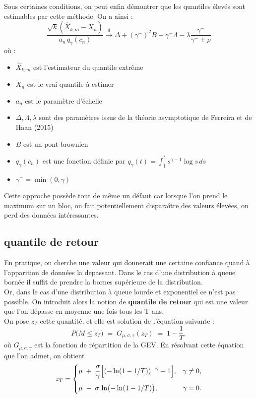 \documentclass{article}
\theoremstyle{plain}
\theoremstyle{definition}
\theoremstyle{plain}
\begin{document}
\noindent Sous certaines conditions, on peut enfin démontrer que les quantiles élevés sont estimables par cette méthode. On a ainsi :
\[
\frac{\sqrt{k} \left( \hat{X}_{k,m} - X_n \right)}{a_n \, q_{\gamma}(c_n)}
\xrightarrow{d}
\Delta + (\gamma^-)^2 B - \gamma^- \Lambda - \lambda \frac{\gamma^-}{\gamma^- + \rho}
\]
où : \begin{itemize}
	\item $\hat{X}_{k,m}$ est l’estimateur du quantile extrême
	\item $X_n$ est le vrai quantile à estimer
	\item $a_n$ est le paramètre d'échelle
	\item $\Delta, \Lambda, \lambda$ sont des paramètres issus de la théorie asymptotique de Ferreira et de Haan (2015)
	\item $B$ est un pont brownien
	\item $q_{\gamma}(c_n)$ est une fonction définie par $q_{\gamma}(t) = \int_1^t s^{\gamma - 1} \log s \, ds$
	\item $\gamma^- = \min(0, \gamma)$
\end{itemize}
\vspace{0.5cm}
\noindent Cette approche possède tout de même un défaut car lorsque l'on prend le maximum sur un bloc, on fait potentiellement disparaître des valeurs élevées, on perd des données intéressantes.

\subsection{quantile de retour}

En pratique, on cherche une valeur qui donnerait une certaine confiance quand à l'apparition
de données la depassant. Dans le cas d'une distribution à queue bornée il suffit de prendre la bornes supérieure de la distribution.
\\
Or, dans le cas d'une distribution à queue lourde et exponentiel ce n'est pas possible. On introduit alors la notion de \textbf{quantile de retour} qui est une valeur que l'on dépasse en moyenne une fois tous les T ans.
\\
On pose $z_T$ cette quantité, et elle est solution de l'équation suivante :
\[
P\bigl(M \le z_T\bigr)
\;=\;
G_{\mu,\sigma,\gamma}(z_T)
\;=\;
1 - \frac{1}{T},
\]
où \(G_{\mu,\sigma,\gamma}\) est la fonction de répartition de la GEV. En résolvant cette équation que l'on admet, on obtient
\[
z_T =
\begin{cases}
\displaystyle
\mu \;+\;\frac{\sigma}{\gamma}\Bigl[(-\ln(1 - 1/T))^{-\gamma} - 1\Bigr],
&\gamma \neq 0,\\[1em]
\displaystyle
\mu \;-\;\sigma\,\ln\bigl(-\ln(1 - 1/T)\bigr),
&\gamma = 0.
\end{cases}
\]
\\
\\
\end{document}

